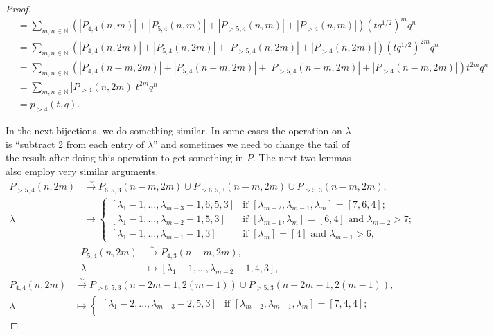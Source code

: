 \documentclass[a4paper, 12pt, reqno]{amsart}
\theoremstyle{remark}
\numberwithin{equation}{subsection}
\begin{document}
\begin{proof}
\begin{align*}
    &= \sum_{m, n \in \mathbb{N}}(|P_{4, 4}(n, m)| + |P_{5, 4}(n, m)| + |P_{>5, 4}(n, m)| + |P_{>4}(n, m)|)(tq^{1/2})^mq^n \\
    &= \sum_{m, n \in \mathbb{N}}(|P_{4, 4}(n, 2m)| + |P_{5, 4}(n, 2m)| + |P_{>5, 4}(n, 2m)| + |P_{>4}(n, 2m)|)(tq^{1/2})^{2m}q^n \\
    &= \sum_{m, n \in \mathbb{N}}(|P_{4, 4}(n - m, 2m)| + |P_{5, 4}(n - m, 2m)| + |P_{>5, 4}(n - m, 2m)| + |P_{>4}(n - m, 2m)|)t^{2m}q^n \\
    &= \sum_{m, n \in \mathbb{N}}|P_{>4}(n, 2m)|t^{2m}q^n \\
    &= p_{>4}(t, q).
  \end{align*}

  In the next bijections, we do something similar.
  In some cases the operation on $\lambda$ is ``subtract 2 from each entry of $\lambda$'' and sometimes we need to change the tail of the result after doing this operation to get something in $P$.
  The next two lemmas also employ very similar arguments.
  \begin{align*}
    P_{>5, 4}(n, 2m) &\xrightarrow{\sim} P_{6, 5, 3}(n - m, 2m) \cup P_{>6, 5, 3}(n - m, 2m) \cup P_{>5, 3}(n - m, 2m), \\
    \lambda &\mapsto
              \begin{cases}
                [\lambda_1 - 1, \dots, \lambda_{m - 3} - 1, 6, 5, 3] &\text{if }[\lambda_{m - 2}, \lambda_{m - 1}, \lambda_m] = [7, 6, 4]; \\
                [\lambda_1 - 1, \dots, \lambda_{m - 2} - 1, 5, 3] &\text{if }[\lambda_{m - 1}, \lambda_m] = [6, 4]\text{ and }\lambda_{m - 2} > 7; \\
                [\lambda_1 - 1, \dots, \lambda_{m - 1} - 1, 3] &\text{if }[\lambda_m] = [4]\text{ and }\lambda_{m - 1} > 6,
              \end{cases}
  \end{align*}
  \begin{align*}
    P_{5, 4}(n, 2m) &\xrightarrow{\sim} P_{4, 3}(n - m, 2m), \\
    \lambda &\mapsto [\lambda_1 - 1, \dots, \lambda_{m - 2} - 1, 4, 3],
  \end{align*}
  \begin{align*}
    P_{4, 4}(n, 2m) &\xrightarrow{\sim} P_{>6, 5, 3}(n - 2m - 1, 2(m - 1)) \cup P_{>5, 3}(n - 2m - 1, 2(m - 1)), \\
    \lambda &\mapsto
              \begin{cases}
                [\lambda_1 - 2, \dots, \lambda_{m - 3} - 2, 5, 3] &\text{if }[\lambda_{m - 2}, \lambda_{m - 1}, \lambda_m] = [7, 4, 4]; \\

\end{cases}
\end{align*}
\end{proof}
\end{document}
